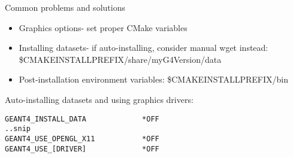 \documentclass[aspectratio=169]{beamer}
\begin{document}
\begin{frame}[fragile]{Common problems and solutions}
  \begin{itemize}
  \item Graphics options- set proper CMake variables
  \item Installing datasets- if auto-installing, consider manual wget instead: \$CMAKE\textunderscore INSTALL\textunderscore PREFIX/share/myG4Version/data
  \item Post-installation environment variables: \$CMAKE\textunderscore INSTALL\textunderscore PREFIX/bin
  \end{itemize}

  \begin{block}{Auto-installing datasets and using graphics drivers:}
    \begin{Verbatim}[fontsize=\small]
GEANT4_INSTALL_DATA             *OFF                                                               
..snip
GEANT4_USE_OPENGL_X11           *OFF
GEANT4_USE_[DRIVER]             *OFF
    \end{Verbatim}
  \end{block}
\end{frame}

\title[Title]{}
\author{Oisin O'Connell (oisin@lanl.gov), ISR-1\\ Mentor: Dr. Mark Galassi}
\institute{}
\date{}

\begin{frame}
  \maketitle
\end{frame}
\end{document}
